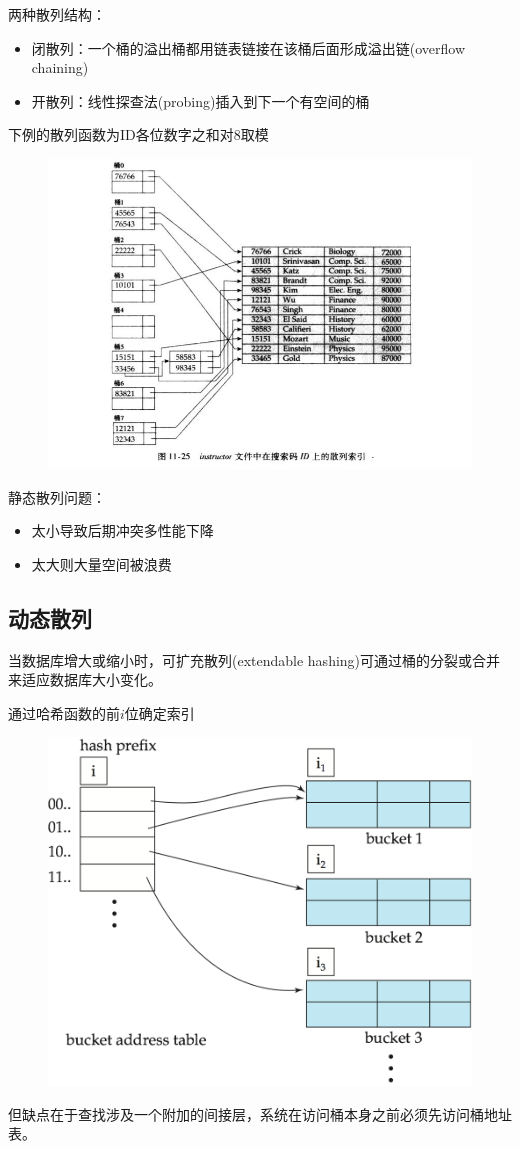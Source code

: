 两种散列结构：
\begin{itemize}
	\item 闭散列：一个桶的溢出桶都用链表链接在该桶后面形成溢出链(overflow chaining)
	\item 开散列：线性探查法(probing)插入到下一个有空间的桶
\end{itemize}

下例的散列函数为ID各位数字之和对8取模
\begin{figure}[H]
\centering
\includegraphics[width=\linewidth]{fig/hash_index.png}
\end{figure}

静态散列问题：
\begin{itemize}
	\item 太小导致后期冲突多性能下降
	\item 太大则大量空间被浪费
\end{itemize}

\subsection{动态散列}
当数据库增大或缩小时，可扩充散列(extendable hashing)可通过桶的分裂或合并来适应数据库大小变化。

通过哈希函数的前$i$位确定索引
\begin{figure}[H]
\centering
\includegraphics[width=0.6\linewidth]{fig/extendable_hash.png}
\end{figure}
但缺点在于查找涉及一个附加的间接层，系统在访问桶本身之前必须先访问桶地址表。

